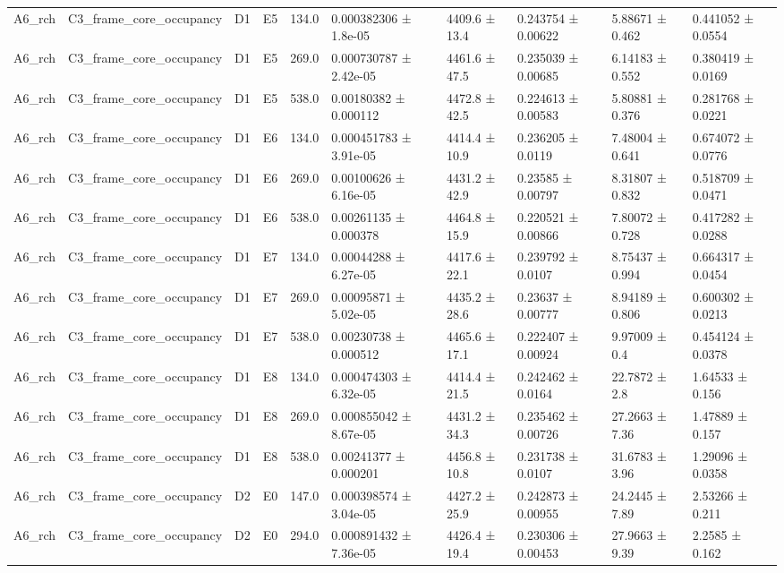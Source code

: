 \begin{table}
\begin{tabular}{llllllllll}
A6\_rch & C3\_frame\_core\_occupancy & D1 & E5 & 134.0 & 0.000382306 ± 1.8e-05 & 4409.6 ± 13.4 & 0.243754 ± 0.00622 & 5.88671 ± 0.462 & 0.441052 ± 0.0554 \\
A6\_rch & C3\_frame\_core\_occupancy & D1 & E5 & 269.0 & 0.000730787 ± 2.42e-05 & 4461.6 ± 47.5 & 0.235039 ± 0.00685 & 6.14183 ± 0.552 & 0.380419 ± 0.0169 \\
A6\_rch & C3\_frame\_core\_occupancy & D1 & E5 & 538.0 & 0.00180382 ± 0.000112 & 4472.8 ± 42.5 & 0.224613 ± 0.00583 & 5.80881 ± 0.376 & 0.281768 ± 0.0221 \\
A6\_rch & C3\_frame\_core\_occupancy & D1 & E6 & 134.0 & 0.000451783 ± 3.91e-05 & 4414.4 ± 10.9 & 0.236205 ± 0.0119 & 7.48004 ± 0.641 & 0.674072 ± 0.0776 \\
A6\_rch & C3\_frame\_core\_occupancy & D1 & E6 & 269.0 & 0.00100626 ± 6.16e-05 & 4431.2 ± 42.9 & 0.23585 ± 0.00797 & 8.31807 ± 0.832 & 0.518709 ± 0.0471 \\
A6\_rch & C3\_frame\_core\_occupancy & D1 & E6 & 538.0 & 0.00261135 ± 0.000378 & 4464.8 ± 15.9 & 0.220521 ± 0.00866 & 7.80072 ± 0.728 & 0.417282 ± 0.0288 \\
A6\_rch & C3\_frame\_core\_occupancy & D1 & E7 & 134.0 & 0.00044288 ± 6.27e-05 & 4417.6 ± 22.1 & 0.239792 ± 0.0107 & 8.75437 ± 0.994 & 0.664317 ± 0.0454 \\
A6\_rch & C3\_frame\_core\_occupancy & D1 & E7 & 269.0 & 0.00095871 ± 5.02e-05 & 4435.2 ± 28.6 & 0.23637 ± 0.00777 & 8.94189 ± 0.806 & 0.600302 ± 0.0213 \\
A6\_rch & C3\_frame\_core\_occupancy & D1 & E7 & 538.0 & 0.00230738 ± 0.000512 & 4465.6 ± 17.1 & 0.222407 ± 0.00924 & 9.97009 ± 0.4 & 0.454124 ± 0.0378 \\
A6\_rch & C3\_frame\_core\_occupancy & D1 & E8 & 134.0 & 0.000474303 ± 6.32e-05 & 4414.4 ± 21.5 & 0.242462 ± 0.0164 & 22.7872 ± 2.8 & 1.64533 ± 0.156 \\
A6\_rch & C3\_frame\_core\_occupancy & D1 & E8 & 269.0 & 0.000855042 ± 8.67e-05 & 4431.2 ± 34.3 & 0.235462 ± 0.00726 & 27.2663 ± 7.36 & 1.47889 ± 0.157 \\
A6\_rch & C3\_frame\_core\_occupancy & D1 & E8 & 538.0 & 0.00241377 ± 0.000201 & 4456.8 ± 10.8 & 0.231738 ± 0.0107 & 31.6783 ± 3.96 & 1.29096 ± 0.0358 \\
A6\_rch & C3\_frame\_core\_occupancy & D2 & E0 & 147.0 & 0.000398574 ± 3.04e-05 & 4427.2 ± 25.9 & 0.242873 ± 0.00955 & 24.2445 ± 7.89 & 2.53266 ± 0.211 \\
A6\_rch & C3\_frame\_core\_occupancy & D2 & E0 & 294.0 & 0.000891432 ± 7.36e-05 & 4426.4 ± 19.4 & 0.230306 ± 0.00453 & 27.9663 ± 9.39 & 2.2585 ± 0.162 \\

\end{tabular}
\end{table}
